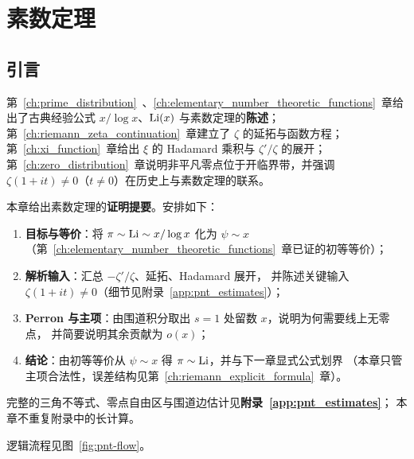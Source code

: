 
\chapter{素数定理}\label{ch:prime_number_theorem}

\section*{引言}\label{sec:pnt_ch_intro}

第~\ref{ch:prime_distribution}~、\ref{ch:elementary_number_theoretic_functions}~章给出了古典经验公式
$x/\log x$、$\operatorname{Li}(x)$ 与素数定理的\textbf{陈述}；
第~\ref{ch:riemann_zeta_continuation}~章建立了 $\zeta$ 的延拓与函数方程；
第~\ref{ch:xi_function}~章给出 $\xi$ 的 Hadamard 乘积与 $\zeta'/\zeta$ 的展开；
第~\ref{ch:zero_distribution}~章说明非平凡零点位于开临界带，并强调
$\zeta(1+it)\neq 0$（$t\neq 0$）在历史上与素数定理的联系。

本章给出素数定理的\textbf{证明提要}。安排如下：
\begin{enumerate}
  \item \textbf{目标与等价}：将 $\pi\sim\operatorname{Li}\sim x/\log x$ 化为 $\psi\sim x$
    （第~\ref{ch:elementary_number_theoretic_functions}~章已证的初等等价）；
  \item \textbf{解析输入}：汇总 $-\zeta'/\zeta$、延拓、Hadamard 展开，
    并陈述关键输入 $\zeta(1+it)\neq 0$（细节见附录~\ref{app:pnt_estimates}）；
  \item \textbf{Perron 与主项}：由围道积分取出 $s=1$ 处留数 $x$，说明为何需要线上无零点，
    并简要说明其余贡献为 $o(x)$；
  \item \textbf{结论}：由初等等价从 $\psi\sim x$ 得 $\pi\sim\operatorname{Li}$，并与下一章显式公式划界
    （本章只管主项合法性，误差结构见第~\ref{ch:riemann_explicit_formula}~章）。
\end{enumerate}
完整的三角不等式、零点自由区与围道边估计见\textbf{附录~\ref{app:pnt_estimates}}；
本章不重复附录中的长计算。

逻辑流程见图~\ref{fig:pnt-flow}。


